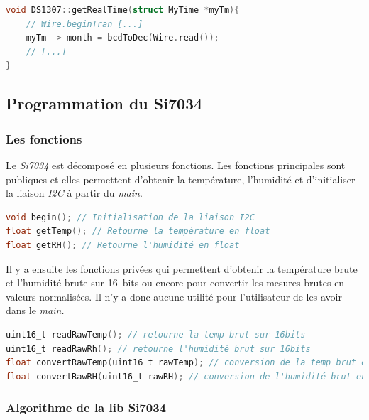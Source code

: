 \begin{lstlisting}[style=myC, caption=Extrait de la fonction getRealTime,  language=C, frame=lines]
void DS1307::getRealTime(struct MyTime *myTm){
    // Wire.beginTran [...]
    myTm -> month = bcdToDec(Wire.read());
    // [...]
}
\end{lstlisting}







        \subsection{Programmation du Si7034}
            \subsubsection{Les fonctions}


            Le \textit{Si7034} est décomposé en plusieurs fonctions. Les fonctions principales sont publiques et elles permettent d'obtenir la température, l'humidité et d'initialiser la liaison \textit{I2C} à partir du \textit{main}.

\begin{lstlisting}[style=myC, caption=Fonctions publiques de la librairie Si7034, language=C, frame=lines]
void begin(); // Initialisation de la liaison I2C
float getTemp(); // Retourne la température en float
float getRH(); // Retourne l'humidité en float
\end{lstlisting}

        \vspace{.5 cm}

        Il y a ensuite les fonctions privées qui permettent d'obtenir la température brute et l'humidité brute sur 16~bits ou encore pour convertir les mesures brutes en valeurs normalisées. Il n'y a donc aucune utilité pour l'utilisateur de les avoir dans le \textit{main.}

\begin{lstlisting}[style=myC, caption=Fonctions privées de la librairie Si7034, language=C, frame=lines]
uint16_t readRawTemp(); // retourne la temp brut sur 16bits
uint16_t readRawRh(); // retourne l'humidité brut sur 16bits
float convertRawTemp(uint16_t rawTemp); // conversion de la temp brut en float
float convertRawRH(uint16_t rawRH); // conversion de l'humidité brut en float 
\end{lstlisting}


        \subsubsection{Algorithme de la lib Si7034}

